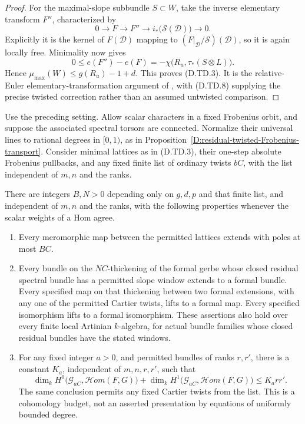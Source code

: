 \begin{proof}
For the maximal-slope subbundle $S\subset W$, take the inverse
elementary transform $F''$, characterized by
\[
       0\longrightarrow F\longrightarrow F''
          \longrightarrow i_*\bigl(\mathcal S(\mathcal D)\bigr)
          \longrightarrow0.
                                                               \tag{D.TD.10}
\]
Explicitly it is the kernel of $F(\mathcal D)$ mapping to
$(F|_{\mathcal D}/\mathcal S)(\mathcal D)$, so it is again locally
free. Minimality now gives
\[
      0\leq e(F'')-e(F)
             =-\chi\bigl(R_u,\tau_*(S\otimes L)\bigr).
                                                               \tag{D.TD.11}
\]
Hence $\mu_{\max}(W)\leq g(R_u)-1+d$. This proves (D.TD.3).
It is the relative-Euler elementary-transformation argument of
\citet[Definition 1.2 and Lemma 1.3, complete proof]
{C_Langer2026}, with (D.TD.8) supplying the precise twisted
correction rather than an assumed untwisted comparison.
\end{proof}

\begin{proposition}
\label{D:twisted-period-independent-normal-depth}
Use the preceding setting. Allow scalar characters in a fixed
Frobenius orbit, and suppose the associated spectral torsors are
connected. Normalize their universal lines to rational degrees
in $[0,1)$, as in
Proposition~\ref{D:residual-twisted-Frobenius-transport}.
Consider minimal lattices as in (D.TD.3), their one-step absolute
Frobenius pullbacks, and any fixed finite list of ordinary twists
$bC$, with the list independent of $m,n$ and the ranks.

There are integers $B,N>0$ depending only on $g,d,p$ and that
finite list, and independent of $m,n$ and the ranks, with the
following properties whenever the scalar weights of a Hom agree.

\begin{enumerate}
\item Every meromorphic map between the permitted lattices extends
with poles at most $BC$.
\item Every bundle on the $NC$-thickening of the formal gerbe
whose closed residual spectral bundle has a permitted slope window
extends to a formal bundle. Every specified map on that thickening
between two formal extensions, with any one of the permitted
Cartier twists, lifts to a formal map. Every specified isomorphism
lifts to a formal isomorphism.
These assertions also hold over every finite local Artinian
$k$-algebra, for actual bundle families whose closed residual
bundles have the stated windows.
\item For any fixed integer $a>0$, and permitted bundles of ranks
$r,r'$, there is a constant $K_a$, independent of $m,n,r,r'$, such
that
\[
 \dim_k H^0\bigl(\mathcal G_{aC},\mathcal Hom(F,G)\bigr)
 +\dim_k H^1\bigl(\mathcal G_{aC},\mathcal Hom(F,G)\bigr)
                            \leq K_a rr'.                    \tag{D.TD.12}
\]
The same conclusion permits any fixed Cartier twists from the
list. This is a cohomology budget, not an asserted presentation
by equations of uniformly bounded degree.
\end{enumerate}
\end{proposition}

